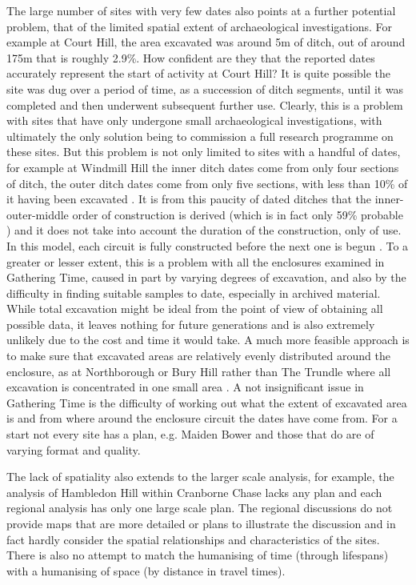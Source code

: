 The large number of sites with very few dates also points at a further potential problem, that of the limited spatial extent of archaeological investigations. For example at Court Hill, the area excavated was around 5m of ditch, out of around 175m \citep[242]{Whittle:2011kl} that is roughly 2.9\%. How confident are they that the reported dates accurately represent the start of activity at Court Hill? It is quite possible the site was dug over a period of time, as a succession of ditch segments, until it was completed and then underwent subsequent further use. Clearly, this is a problem with sites that have only undergone small archaeological investigations, with ultimately the only solution being to commission a full research programme on these sites. But this problem is not only limited to sites with a handful of dates, for example at Windmill Hill the inner ditch dates come from only four sections of ditch, the outer ditch dates come from only five sections, with less than 10\% of it having been excavated \citep[63]{Whittle:2011kl}. It is from this paucity of dated ditches that the inner-outer-middle order of construction is derived (which is in fact only 59\% probable \citealp[91]{Whittle:2011kl}) and it does not take into account the duration of the construction, only of use. In this model, each circuit is fully constructed before the next one is begun \citep[91]{Whittle:2011kl}. To a greater or lesser extent, this is a problem with all the enclosures examined in Gathering Time, caused in part by varying degrees of excavation, and also by the difficulty in finding suitable samples to date, especially in archived material. While total excavation might be ideal from the point of view of obtaining all possible data, it leaves nothing for future generations and is also extremely unlikely due to the cost and time it would take. A much more feasible approach is to make sure that excavated areas are relatively evenly distributed around the enclosure, as at Northborough \citep[328]{Whittle:2011kl} or Bury Hill \citep[240]{Whittle:2011kl} rather than The Trundle where all excavation is concentrated in one small area \citep[233]{Whittle:2011kl}. A not insignificant issue in Gathering Time is the difficulty of working out what the extent of excavated area is and from where around the enclosure circuit the dates have come from. For a start not every site has a plan, e.g. Maiden Bower \citep[265]{Whittle:2011kl} and those that do are of varying format and quality.

The lack of spatiality also extends to the larger scale analysis, for example, the analysis of Hambledon Hill within Cranborne Chase \citep[151]{Whittle:2011kl} lacks any plan and each regional analysis has only one large scale plan. The regional discussions do not provide maps that are more detailed or plans to illustrate the discussion and in fact hardly consider the spatial relationships and characteristics of the sites. There is also no attempt to match the humanising of time (through lifespans) with a humanising of space (by distance in travel times).

